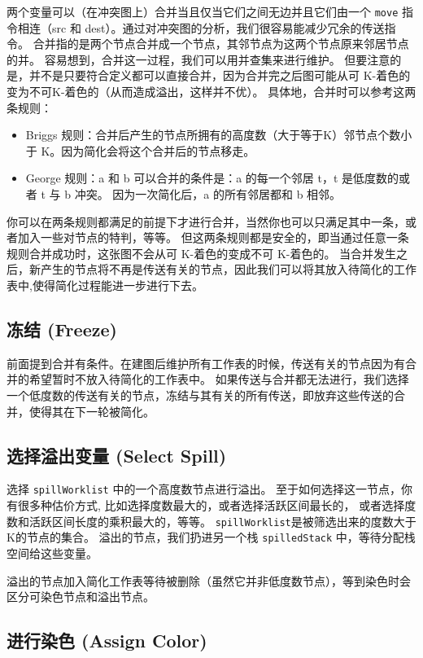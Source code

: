 两个变量可以（在冲突图上）合并当且仅当它们之间无边并且它们由一个 \texttt{move} 指令相连（src 和 dest）。通过对冲突图的分析，我们很容易能减少冗余的传送指令。
合并指的是两个节点合并成一个节点，其邻节点为这两个节点原来邻居节点的并。
容易想到，合并这一过程，我们可以用并查集来进行维护。
但要注意的是，并不是只要符合定义都可以直接合并，因为合并完之后图可能从可 K-着色的变为不可K-着色的（从而造成溢出，这样并不优）。
具体地，合并时可以参考这两条规则：
\begin{itemize}
    \item Briggs 规则：合并后产生的节点所拥有的高度数（大于等于K）邻节点个数小于 K。因为简化会将这个合并后的节点移走。
    \item George 规则：a 和 b 可以合并的条件是：a 的每一个邻居 t，t 是低度数的或者 t 与 b 冲突。
    因为一次简化后，a 的所有邻居都和 b 相邻。
\end{itemize}

你可以在两条规则都满足的前提下才进行合并，当然你也可以只满足其中一条，或者加入一些对节点的特判，等等。
但这两条规则都是安全的，即当通过任意一条规则合并成功时，这张图不会从可 K-着色的变成不可 K-着色的。
当合并发生之后，新产生的节点将不再是传送有关的节点，因此我们可以将其放入待简化的工作表中,使得简化过程能进一步进行下去。

\subsection{冻结 (Freeze)}

前面提到合并有条件。在建图后维护所有工作表的时候，传送有关的节点因为有合并的希望暂时不放入待简化的工作表中。
如果传送与合并都无法进行，我们选择一个低度数的传送有关的节点，冻结与其有关的所有传送，即放弃这些传送的合并，使得其在下一轮被简化。

\subsection{选择溢出变量 (Select Spill)}

选择 \texttt{spillWorklist} 中的一个高度数节点进行溢出。
至于如何选择这一节点，你有很多种估价方式, 比如选择度数最大的，或者选择活跃区间最长的，
或者选择度数和活跃区间长度的乘积最大的，等等。
\texttt{spillWorklist}是被筛选出来的度数大于K的节点的集合。
溢出的节点，我们扔进另一个栈 \texttt{spilledStack} 中，等待分配栈空间给这些变量。

溢出的节点加入简化工作表等待被删除（虽然它并非低度数节点），等到染色时会区分可染色节点和溢出节点。

\subsection{进行染色 (Assign Color)}

